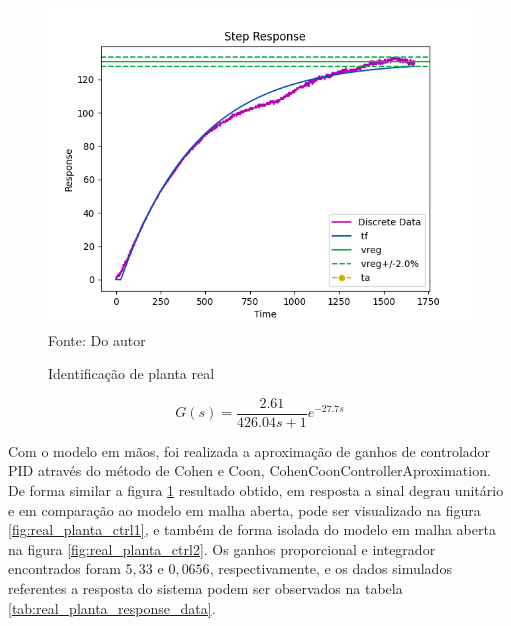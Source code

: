 \begin{figure}[H]
    \centering
    \caption{Identificação de planta real}
    \includegraphics[scale=0.8]{figuras/real_planta_ident}
    \label{fig:real_planta_ident}
    \\
    \vspace{0cm}\hspace{0cm}\small{Fonte: Do autor}
\end{figure}

\begin{equation}
    \label{eq:real_planta_model}
    G(s) = \frac{2.61}{426.04 s + 1}e^{-27.7 s}
\end{equation}

Com o modelo em mãos, foi realizada a aproximação de ganhos de controlador PID através do método de Cohen e Coon,
CohenCoonControllerAproximation.
De forma similar a figura \ref{fig:real_planta_ident} resultado obtido, em resposta a sinal degrau unitário e em
comparação ao modelo em malha aberta, pode ser visualizado
na figura \ref{fig:real_planta_ctrl1}, e também de forma isolada do modelo em malha aberta na figura
\ref{fig:real_planta_ctrl2}.
Os ganhos proporcional e integrador encontrados foram $5,33$ e $0,0656$, respectivamente, e os
dados simulados referentes a resposta do sistema podem ser observados na tabela \ref{tab:real_planta_response_data}.

